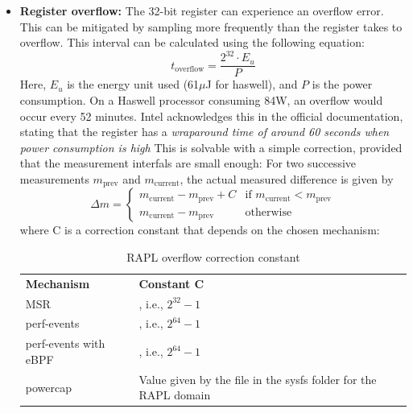\begin{itemize}
    \item \textbf{Register overflow: }The 32-bit register can experience an overflow error\parencite{khan2018rapl, raffin2024dissecting}. This can be mitigated by sampling more frequently than the register takes to overflow. This interval can be calculated using the following equation: 
    \begin{equation}
        t_{\text{overflow}} = \frac{2^{32} \cdot E_u}{P}
    \end{equation}
    Here, $E_u$ is the energy unit used (61$\mu$J for haswell), and $P$ is the power consumption. On a Haswell processor consuming 84W, an overflow would occur every 52 minutes. Intel acknowledges this in the official documentation, stating that the register has a \textit{wraparound time of around 60 seconds when power consumption is high}\parencite{intel-sdm}
    This is solvable with a simple correction, provided that the measurement interfals are small enough: For two successive measurements $m_{\text{prev}}$ and $m_{\text{current}}$, the actual measured difference is given by
    \begin{equation}
        \Delta m =
        \begin{cases}
        m_{\text{current}} - m_{\text{prev}} + C & \text{if } m_{\text{current}} < m_{\text{prev}} \\
        m_{\text{current}} - m_{\text{prev}} & \text{otherwise}
        \end{cases}
    \end{equation}
    where C is a correction constant that depends on the chosen mechanism:
    
    \begin{table}[h]
        \small
        \centering
        \begin{tabular}{ |L{4cm} | L{9cm}| }
            \hline
            \textbf{Mechanism} & \textbf{Constant C} \\
            \Xhline{1.5pt}
            MSR & , i.e., $2^{32} - 1$ \\
            \hline
            perf-events & , i.e., $2^{64} - 1$ \\
            \hline
            perf-events with eBPF & , i.e., $2^{64} - 1$ \\
            \hline
            powercap & Value given by the file  in the sysfs folder for the RAPL domain \\
            \hline
        \end{tabular}
        \caption[RAPL overflow correction constant]{RAPL overflow correction constant}
        \label{tab:RAPL_overflow_correction_constant}
    \end{table}



\end{itemize}
